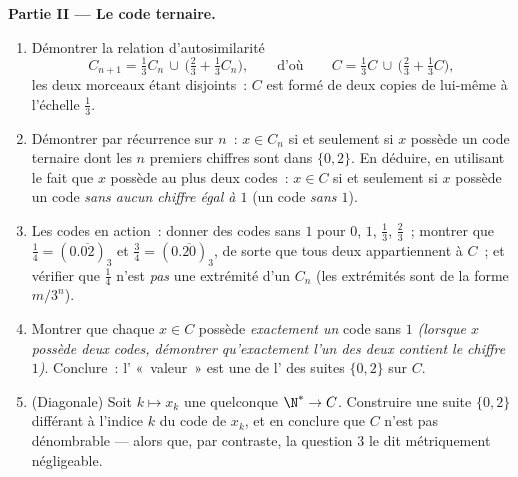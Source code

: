 \begin{problem}[{Devoir maison --- l'\omterm{def:b1:logic:sets}{ensemble} triadique de Cantor~:
longueur nulle, non dénombrable, parfait, et $C + C =
\intcc{0}{2}$}]
\medskip
\noindent\textbf{Partie II --- Le code ternaire.}
\begin{enumerate}[resume]
  \item Démontrer la relation d'autosimilarité
        \[
        C_{n+1} = \tfrac13 C_n \,\cup\,
        \bigl(\tfrac23 + \tfrac13 C_n\bigr),
        \qquad\text{d'où}\qquad
        C = \tfrac13 C \,\cup\, \bigl(\tfrac23 + \tfrac13
        C\bigr),
        \]
        les deux morceaux étant disjoints~: $C$ est formé de deux
        copies de lui-même à l'échelle $\frac13$.
  \item Démontrer par récurrence sur $n$~: $x \in C_n$ si et
        seulement si $x$ possède un code ternaire dont les $n$
        premiers chiffres sont dans $\{0, 2\}$. En déduire, en
        utilisant le fait que $x$ possède au plus deux codes~:
        $x \in C$ si et seulement si $x$ possède un code
        \emph{sans aucun chiffre égal à $1$} (un code \emph{sans
        $1$}).
  \item Les codes en action~: donner des codes sans $1$ pour $0$,
        $1$, $\frac13$, $\frac23$~; montrer que
        $\frac14 = (0.\overline{02})_3$ et
        $\frac34 = (0.\overline{20})_3$, de sorte que tous deux
        appartiennent à $C$~; et vérifier que $\frac14$ n'est
        \emph{pas} une extrémité d'un $C_n$ (les extrémités sont
        de la forme $m/3^n$).
  \item Montrer que chaque $x \in C$ possède \emph{exactement un}
        code sans $1$ \emph{(lorsque $x$ possède deux codes,
        démontrer qu'exactement l'un des deux contient le chiffre
        $1$)}. Conclure~: l' «~valeur~» est une
         de l' des suites $\{0,2\}$ sur $C$.
  \item (Diagonale) Soit $k \mapsto x_k$ une 
        quelconque $\N^* \to C$. Construire une suite $\{0, 2\}$
        différant à l'indice $k$ du code de $x_k$, et en conclure
        que $C$ n'est pas dénombrable --- alors que, par
        contraste, la question 3 le dit métriquement négligeable.
\end{enumerate}


\end{problem}
